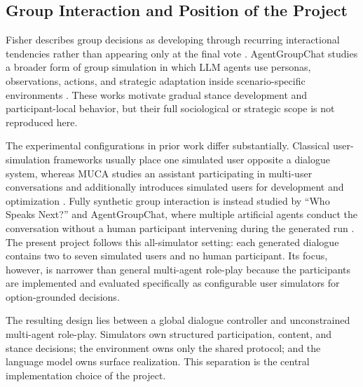 \subsection{Group Interaction and Position of the Project}

Fisher describes group decisions as developing through recurring interactional tendencies rather than appearing only at the final vote \citep{fisher1970decision}. AgentGroupChat studies a broader form of group simulation in which LLM agents use personas, observations, actions, and strategic adaptation inside scenario-specific environments \citep{gu2024agentgroupchat}. These works motivate gradual stance development and participant-local behavior, but their full sociological or strategic scope is not reproduced here.

The experimental configurations in prior work differ substantially. Classical user-simulation frameworks usually place one simulated user opposite a dialogue system, whereas MUCA studies an assistant participating in multi-user conversations and additionally introduces simulated users for development and optimization \citep{schatzmann2007agenda,zhu2023convlab3,mao2024muca}. Fully synthetic group interaction is instead studied by ``Who Speaks Next?'' and AgentGroupChat, where multiple artificial agents conduct the conversation without a human participant intervening during the generated run \citep{nonomura2025whospeaks,gu2024agentgroupchat}. The present project follows this all-simulator setting: each generated dialogue contains two to seven simulated users and no human participant. Its focus, however, is narrower than general multi-agent role-play because the participants are implemented and evaluated specifically as configurable user simulators for option-grounded decisions.

The resulting design lies between a global dialogue controller and unconstrained multi-agent role-play. Simulators own structured participation, content, and stance decisions; the environment owns only the shared protocol; and the language model owns surface realization. This separation is the central implementation choice of the project.
